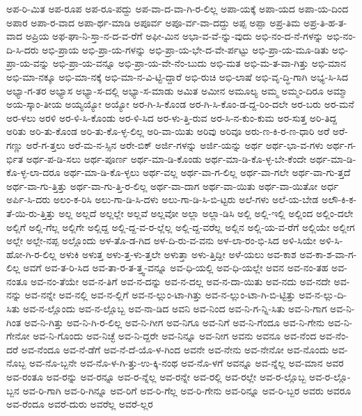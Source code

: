 {ಅಪ-ರಿ-ಮಿತ
ಅಪ-ರೂಪ
ಅಪ-ರೂ-ಪದ್ದು
ಅಪ-ವಾ-ದ-ವಾ-ಗಿ-ರ-ಲಿಲ್ಲ
ಅಪಾ-ಯಕ್ಕೆ
ಅಪಾ-ಯದ
ಅಪಾ-ಯ-ದಿಂದ
ಅಪಾರ
ಅಪಾ-ರ-ವಾದ
ಅಪಾ-ರ್ಥ-ಮಾಡಿ
ಅಪೂರ್ವ
ಅಪೂ-ರ್ವ-ವಾ-ದದ್ದು
ಅಪ್ಪ
ಅಪ್ಪಾ
ಅಪ್ರ-ತಿಮ
ಅಪ್ರ-ತಿ-ಹ-ತ-ವಾದ
ಅಪ್ರಿಯ
ಅಫ-ಘಾ-ನಿ-ಸ್ತಾ-ನ-ದ-ವ-ರೆಗೆ
ಅಫೀ-ಮಿನ
ಅಭಾ-ವ-ವೆ-ನ್ನು-ವುದು
ಅಭಿ-ನಂ-ದ-ನೆ-ಗಳನ್ನು
ಅಭಿ-ನಂ-ದಿ-ಸಿ-ದರು
ಅಭಿ-ಪ್ರಾಯ
ಅಭಿ-ಪ್ರಾ-ಯ-ಗಳನ್ನು
ಅಭಿ-ಪ್ರಾ-ಯ-ಭೇ-ದ-ವೇ-ರ್ಪಟ್ಟು
ಅಭಿ-ಪ್ರಾ-ಯ-ಮೂ-ಡಿತು
ಅಭಿ-ಪ್ರಾ-ಯ-ವನ್ನು
ಅಭಿ-ಪ್ರಾ-ಯ-ವನ್ನೂ
ಅಭಿ-ಪ್ರಾ-ಯ-ವೇ-ನೆಂ-ಬುದು
ಅಭಿ-ಮತ
ಅಭಿ-ಮ-ತ-ವಾ-ಗಿತ್ತು
ಅಭಿ-ಮಾನ
ಅಭಿ-ಮಾ-ನಕ್ಕೂ
ಅಭಿ-ಮಾ-ನಕ್ಕೆ
ಅಭಿ-ಮಾ-ನ-ವಿ-ಟ್ಟಿ-ದ್ದಾರೆ
ಅಭಿ-ರುಚಿ
ಅಭಿ-ಲಾಷೆ
ಅಭಿ-ವೃ-ದ್ಧಿ-ಗಾಗಿ
ಅಭ್ಯ-ಸಿ-ಸಿದ
ಅಭ್ಯಾ-ಗ-ತರ
ಅಭ್ಯಾಸ
ಅಭ್ಯಾ-ಸ-ದಲ್ಲಿ
ಅಭ್ಯಾ-ಸ-ಮಾಡು
ಅಮಿತ
ಅಮೀನ
ಅಮೂಲ್ಯ
ಅಮ್ಮ
ಅಮ್ಮಂ-ದಿರೂ
ಅಮ್ಮಾ
ಅಯ-ಸ್ಕಾಂ-ತೀಯ
ಅಯ್ಯಯ್ಯೋ
ಅಯ್ಯೋ
ಅರ-ಗಿ-ಸಿ-ಕೊಂಡ
ಅರ-ಗಿ-ಸಿ-ಕೊಂ-ಡ-ದ್ದ-ರಿಂ-ದಲೇ
ಅರ-ಬರು
ಅರ-ಮನೆ
ಅರ-ಳಲು
ಅರಳಿ
ಅರ-ಳಿ-ಸಿ-ಕೊಂಡು
ಅರ-ಳಿ-ಸಿದ
ಅರ-ಳು-ತ್ತಿ-ರುವ
ಅರ-ಸಿ-ನ-ಕುಂ-ಕುಮ
ಅರ-ಸುತ್ತ
ಅರಿ-ತಿದ್ದ
ಅರಿತು
ಅರಿ-ತು-ಕೊಂಡ
ಅರಿ-ತು-ಕೊ-ಳ್ಳ-ಲಿಲ್ಲ
ಅರಿ-ವಾ-ಯಿತು
ಅರಿವು
ಅರಿವೂ
ಅರು-ಣ-ಕಿ-ರ-ಣ-ಧಾರಿ
ಅರೆ
ಅರೆ-ಗಣ್ಣು
ಅರೆ-ಗ-ತ್ತಲು
ಅರೆ-ಮ-ನ-ಸ್ಸಿನ
ಅರೇ-ಬಿಕ್
ಅರ್ಜಿ-ಗಳನ್ನು
ಅರ್ಜಿ-ಯನ್ನು
ಅರ್ಥ
ಅರ್ಥ-ಭಾ-ವ-ಗಳು
ಅರ್ಥ-ಗ-ರ್ಭಿತ
ಅರ್ಥ-ಪ-ಡಿ-ಸಲು
ಅರ್ಥ-ಪೂರ್ಣ
ಅರ್ಥ-ಮಾ-ಡಿ-ಕೊಂಡು
ಅರ್ಥ-ಮಾ-ಡಿ-ಕೊ-ಳ್ಳ-ಬೇ-ಕೆಂದೇ
ಅರ್ಥ-ಮಾ-ಡಿ-ಕೊ-ಳ್ಳ-ಲಾ-ದರೂ
ಅರ್ಥ-ಮಾ-ಡಿ-ಕೊ-ಳ್ಳಲು
ಅರ್ಥ-ವಲ್ಲ
ಅರ್ಥ-ವಾ-ಗ-ಲಿಲ್ಲ
ಅರ್ಥ-ವಾ-ಗಲೇ
ಅರ್ಥ-ವಾ-ಗು-ತ್ತದೆ
ಅರ್ಥ-ವಾ-ಗು-ತ್ತಿತ್ತು
ಅರ್ಥ-ವಾ-ಗು-ತ್ತಿ-ರ-ಲಿಲ್ಲ
ಅರ್ಥ-ವಾ-ದಾಗ
ಅರ್ಥ-ವಾ-ಯಿತು
ಅರ್ಥ-ವಾ-ಯಿತೋ
ಅರ್ಧ
ಅರ್ಪಿ-ಸಿ-ದರು
ಅಲಂ-ಕ-ರಿಸಿ
ಅಲು-ಗಾ-ಡಿ-ಸಿ-ದಳು
ಅಲು-ಗಾ-ಡಿ-ಸಿ-ಬಿ-ಟ್ಟರು
ಅಲೆ-ಗಳು
ಅಲೆ-ಯ-ಬೇಡ
ಅಲೌ-ಕಿ-ಕ-ತೆ-ಯಿ-ರು-ತ್ತಿತ್ತು
ಅಲ್ಲ
ಅಲ್ಲದೆ
ಅಲ್ಲಲ್ಲೇ
ಅಲ್ಲವೆ
ಅಲ್ಲವೋ
ಅಲ್ಲಾ
ಅಲ್ಲಾ-ಡಿಸಿ
ಅಲ್ಲಿ
ಅಲ್ಲಿ-ಇಲ್ಲಿ
ಅಲ್ಲಿಂದ
ಅಲ್ಲಿಂ-ದಲೇ
ಅಲ್ಲಿಗೆ
ಅಲ್ಲಿ-ಗೆಲ್ಲ
ಅಲ್ಲಿಗೇ
ಅಲ್ಲಿದ್ದ
ಅಲ್ಲಿ-ದ್ದ-ವ-ರ-ಲ್ಲೆಲ್ಲ
ಅಲ್ಲಿ-ದ್ದ-ವರೆಲ್ಲ
ಅಲ್ಲಿನ
ಅಲ್ಲಿ-ಯ-ವ-ರೆಗೆ
ಅಲ್ಲಿಯೇ
ಅಲ್ಲೀಗ
ಅಲ್ಲೇ
ಅಲ್ಲೇ-ನಪ್ಪ
ಅಲ್ಲೊಂದು
ಅಳ-ತೊ-ಡ-ಗಿದ
ಅಳ-ದಿ-ರು-ವ-ವನು
ಅಳ-ಲಾ-ರಂ-ಭಿ-ಸಿದ
ಅಳಿ-ಸಿಯೇ
ಅಳಿ-ಸಿ-ಹೋ-ಗಿ-ರ-ಲಿಲ್ಲ
ಅಳುಕಿ
ಅಳುತ್ತ
ಅಳು-ತ್ತ-ಳು-ತ್ತಲೇ
ಅಳುತ್ತಾ
ಅಳು-ತ್ತಿದ್ದೀ
ಅಳೆ-ಯಲು
ಅವ-ಕಾಶ
ಅವ-ಕಾ-ಶ-ವಾ-ಗ-ಲಿಲ್ಲ
ಅವಗೆ
ಅವ-ತ-ರಿ-ಸಿದ
ಅವ-ತಾ-ರ-ತ-ತ್ತ್ವ-ವನ್ನೂ
ಅವ-ಧಿ-ಯಲ್ಲಿ
ಅವ-ಧಿ-ಯಲ್ಲೇ
ಅವನ
ಅವ-ನಂ-ತಹ
ಅವ-ನಂತೂ
ಅವ-ನಂ-ತೆಯೇ
ಅವ-ನ-ತಿಗೆ
ಅವ-ನ-ದನ್ನು
ಅವ-ನ-ದಲ್ಲ
ಅವ-ನ-ದಾ-ಯಿತು
ಅವ-ನದು
ಅವ-ನದೇ
ಅವ-ನನ್ನು
ಅವ-ನನ್ನೇ
ಅವ-ನಲ್ಲಿ
ಅವ-ನ-ಲ್ಲಿಗೆ
ಅವ-ನ-ಲ್ಲುಂ-ಟಾ-ಗಿತ್ತು
ಅವ-ನ-ಲ್ಲುಂ-ಟಾ-ಗಿ-ಬಿ-ಟ್ಟಿತ್ತು
ಅವ-ನ-ಲ್ಲು-ದಿ-ಸಿತು
ಅವ-ನ-ಲ್ಲೊಂದು
ಅವ-ನ-ಲ್ಲೊಬ್ಬ
ಅವ-ನಾ-ಡಿದ
ಅವನಿ
ಅವ-ನಿಂದ
ಅವ-ನಿ-ಗ-ನ್ನಿ-ಸಿತು
ಅವ-ನಿ-ಗಾಗ
ಅವ-ನಿ-ಗಿಂತ
ಅವ-ನಿ-ಗಿತ್ತು
ಅವ-ನಿ-ಗಿ-ರ-ಲಿಲ್ಲ
ಅವ-ನಿ-ಗೀಗ
ಅವ-ನಿಗೂ
ಅವ-ನಿಗೆ
ಅವ-ನಿ-ಗೆಂದೂ
ಅವ-ನಿ-ಗೇನು
ಅವ-ನಿ-ಗೇನೋ
ಅವ-ನಿ-ಗೊಂದು
ಅವ-ನಿಚ್ಛೆ
ಅವ-ನಿ-ದ್ದರೇ
ಅವ-ನಿನ್ನೂ
ಅವ-ನೀಗ
ಅವನು
ಅವನೂ
ಅವ-ನೆಂದ
ಅವ-ನೆಂ-ದರೆ
ಅವ-ನೆಂದೂ
ಅವ-ನೆ-ಡೆಗೆ
ಅವ-ನೆ-ದೆ-ಯೊ-ಳ-ಗಿಂದ
ಅವನೇ
ಅವ-ನೇನು
ಅವ-ನೇನೋ
ಅವ-ನೊಂದು
ಅವ-ನೊಬ್ಬ
ಅವ-ನೊ-ಬ್ಬನೇ
ಅವ-ನೊ-ಳ-ಗಿ-ತ್ತು-ಉ-ಕ್ಕಿ-ನಂಥ
ಅವ-ನೊ-ಳಗೆ
ಅವನ್ನೂ
ಅವ-ನ್ನೆಲ್ಲ
ಅವ-ಮಾನ
ಅವರ
ಅವ-ರಂತೂ
ಅವ-ರನ್ನು
ಅವ-ರನ್ನೂ
ಅವ-ರ-ನ್ನೆಲ್ಲ
ಅವ-ರನ್ನೇ
ಅವ-ರಲ್ಲಿ
ಅವ-ರಲ್ಲೇ
ಅವ-ರ-ಲ್ಲೊಬ್ಬ
ಅವ-ರ-ಲ್ಲೊ-ಬ್ಬನ
ಅವ-ರಿ-ಗಾಗಿ
ಅವ-ರಿ-ಗಿನ್ನೂ
ಅವ-ರಿಗೆ
ಅವ-ರಿ-ಗೆಲ್ಲ
ಅವ-ರಿ-ಗೇನು
ಅವ-ರಿನ್ನೂ
ಅವ-ರಿ-ಬ್ಬರ
ಅವರು
ಅವರೂ
ಅವ-ರೆಂದೂ
ಅವರೆ-ದುರು
ಅವರೆಲ್ಲ
ಅವರೆ-ಲ್ಲರ
}
